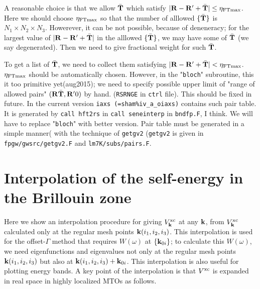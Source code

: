 \documentclass[a4paper,10pt,fleqn]{article}
\def\vxc{V^{\rm xc}}
\newcommand{\bfk}{{\bf k}}
\newcommand{\bfT}{{\bf T}}
\newcommand{\bfR}{{\bf R}}
\begin{document}
A reasonable choice is that we allow $\bar{\bfT}$
which satisfy $|\bfR-\bfR'+\bar{\bfT}|\le\eta_{\rm FTmax}$.
Here we should choose $\eta_{\rm FTmax}$ so that
the number of alllowed $\{\bar{\bf T}\}$ is $N_1 \times N_2 \times N_3$.
Howerever, it can be not possible, because of
deneneracy; for the largest value of $|\bfR-\bfR'+\bar{\bfT}|$ in the
alllowed $\{\bar{\bf T}\}$, we may 
have some of $\bar{\bfT}$ (we say degenerated). 
Then we need to give fractional weight for such $\bar{\bfT}$.

To get a list of $\bar{\bfT}$,
we need to collect them satisfying 
$|\bfR-\bfR'+\bar{\bf T}|<\eta_{\rm FTmax}$.
$\eta_{\rm FTmax}$ should be automatically chosen.
However, in the "{\tt bloch}" subroutine, this it too primitive yet(aug2015);
we need to specify possible upper limit of 
"range of allowed pairs" $(\bfR\bar{\bfT},\bfR'0)$ by hand.
({\tt RSRNGE} in {\tt ctrl} file). This should be fixed in future.
In the current version {\tt iaxs (=\verb#sham%iv_a_oiaxs#)} contains such pair table.
It is generated by {\tt call hft2rs} in {\tt call seneinterp} in {\tt bndfp.F}, I think.
We will have to replace "{\tt bloch}" with better version. Pair table must be generated 
in a simple manner( with the technique of 
{\tt getgv2} ({\tt getgv2} is given in {\tt fpgw/gwsrc/getgv2.F} and {\tt lm7K/subs/pairs.F}. 


\section{Interpolation of the self-energy in the Brillouin zone}
\label{sec:siginterp}
Here we show 
an interpolation procedure for giving
$\vxc_{\bfk}$ at any $\bfk$,
from $\vxc_{\bfk}$ calculated only at the regular mesh points $\bfk(i_1,i_2,i_3)$.
This interpolation is used for the offset-$\Gamma$ method that
requires $W(\omega)$ at $\{\bfk_{0i}\}$;
to calculate this $W(\omega)$, we need 
eigenfunctions and eigenvalues not only 
at the regular mesh points $\bfk(i_1,i_2,i_3)$
but also at $\bfk(i_1,i_2,i_3)+\bfk_{0i}$. 
This interpolation is also useful for plotting
energy bands. %
A key point of the interpolation is that $\vxc$ 
is expanded in real space in highly localized MTOs as follows.
\end{document}
